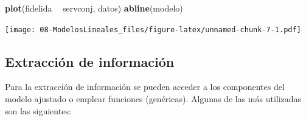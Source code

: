 \documentclass[]{book}
\newenvironment{Shaded}{\begin{snugshade}}{\end{snugshade}}
\newcommand{\KeywordTok}[1]{\textcolor[rgb]{0.13,0.29,0.53}{\textbf{#1}}}
\newcommand{\NormalTok}[1]{#1}
\newcommand{\OperatorTok}[1]{\textcolor[rgb]{0.81,0.36,0.00}{\textbf{#1}}}
\newcommand{\StringTok}[1]{\textcolor[rgb]{0.31,0.60,0.02}{#1}}
\begin{document}
\begin{Shaded}
\begin{Highlighting}[]
\KeywordTok{plot}\NormalTok{(fidelida }\OperatorTok{~}\StringTok{ }\NormalTok{servconj, datos)}
\KeywordTok{abline}\NormalTok{(modelo)}
\end{Highlighting}
\end{Shaded}

\texttt{[image: 08-ModelosLineales\_files/figure-latex/unnamed-chunk-7-1.pdf]}

\hypertarget{extraccion-de-informacion}{%
\subsection{Extracción de información}\label{extraccion-de-informacion}}

Para la extracción de información se pueden acceder a los componentes del modelo ajustado o emplear funciones (genéricas). Algunas de las más utilizadas son las siguientes:
\end{document}
